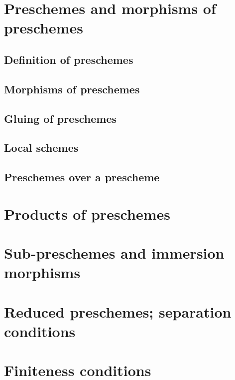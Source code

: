 \documentclass[10pt,oneside]{amsart}
\begin{document}
    \section{Preschemes and morphisms of preschemes}

        \subsection{Definition of preschemes}
        

        \subsection{Morphisms of preschemes}
        

        \subsection{Gluing of preschemes}
        

        \subsection{Local schemes}
        

        \subsection{Preschemes over a prescheme}
        

    \section{Products of preschemes}

    \section{Sub-preschemes and immersion morphisms}

    \section{Reduced preschemes; separation conditions}

    \section{Finiteness conditions}
\end{document}
